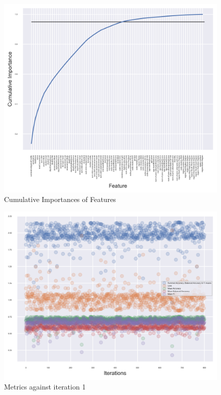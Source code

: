 \documentclass[11pt, a4paper]{article}
\begin{document}
\begin{multicols}{2}
\begin{figure}[H]
	\includegraphics[width=\linewidth]{Importances.png}
	\caption{Cumulative Importances of Features}
	\label{fig:importances}
\end{figure}
\centering
\begin{figure}[H]
	\includegraphics[width=\linewidth]{Accuracy_against_iteration1.png} 
	\caption{Metrics against iteration 1}
	\label{fig:Acc1}
\end{figure}
\centering
\begin{figure}[H]

\end{figure}
\end{multicols}
\end{document}
